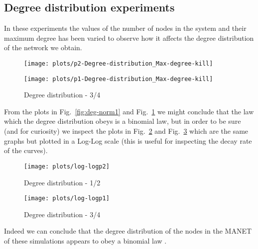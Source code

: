 \documentclass{llncs}
\begin{document}
\subsection{Degree distribution experiments}
In these experiments the values of the number of nodes in the system and their maximum degree has been varied to observe how it affects the degree distribution of the network we obtain.
\begin{figure}[H]
	\centering
	\texttt{[image: plots/p2-Degree-distribution\_Max-degree-kill]}
	\caption{Degree distribution - 1/2}
	\label{fig:deg-norm1}
	\texttt{[image: plots/p1-Degree-distribution\_Max-degree-kill]}
	\caption{Degree distribution - 3/4}
	\label{fig:deg-norm2}
\end{figure}
%
From the plots in Fig.~\ref{fig:deg-norm1} and Fig.~\ref{fig:deg-norm2} we might conclude that the law which the degree distribution obeys is a binomial law, but in order to be sure (and for curiosity) we inspect the plots in Fig.~\ref{fig:deg-log1} and Fig.~\ref{fig:deg-log2} which are the same graphs but plotted in a Log-Log scale (this is useful for inspecting the decay rate of the curves).
\begin{figure}[!h]
	\centering
	\texttt{[image: plots/log-logp2]}
	\caption{Degree distribution - 1/2}
	\label{fig:deg-log1}
\end{figure}
\begin{figure}[!h]
	\texttt{[image: plots/log-logp1]}
	\caption{Degree distribution - 3/4}
	\label{fig:deg-log2}
\end{figure}
Indeed we can conclude that the degree distribution of the nodes in the MANET of these simulations appears to obey a binomial law \cite{bib3}.
\end{document}
